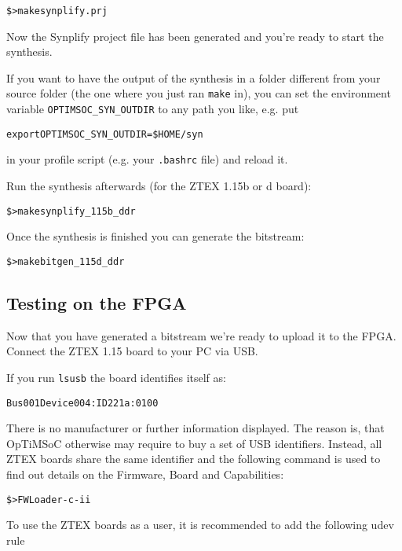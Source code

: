 \begin{alltt}
\$> make synplify.prj
\end{alltt}

Now the Synplify project file has been generated and you're ready to start the
synthesis.

If you want to have the output of the synthesis in a folder different from your
source folder (the one where you just ran \verb|make| in), you can set the
environment variable \verb|OPTIMSOC_SYN_OUTDIR| to any path you like, e.g. put
\begin{alltt}
export OPTIMSOC_SYN_OUTDIR=\$HOME/syn
\end{alltt}
in your profile script (e.g. your \verb|.bashrc| file) and reload it.

Run the synthesis afterwards (for the ZTEX 1.15b or d board):

\begin{alltt}
\$> make synplify_115b_ddr
\end{alltt}

Once the synthesis is finished you can generate the bitstream:

\begin{alltt}
\$> make bitgen_115d_ddr
\end{alltt}

\subsection{Testing on the FPGA}
Now that you have generated a bitstream we're ready to upload it to the FPGA.
Connect the ZTEX 1.15 board to your PC via USB.

If you run \verb|lsusb| the board identifies itself as:

\begin{alltt}
Bus 001 Device 004: ID 221a:0100
\end{alltt}

There is no manufacturer or further information displayed. The reason
is, that OpTiMSoC otherwise may require to buy a set of USB
identifiers. Instead, all ZTEX boards share the same identifier and
the following command is used to find out details on the Firmware,
Board and Capabilities:

\begin{alltt}
\$> FWLoader -c -ii
\end{alltt}

To use the ZTEX boards as a user, it is recommended to add the following
udev rule

